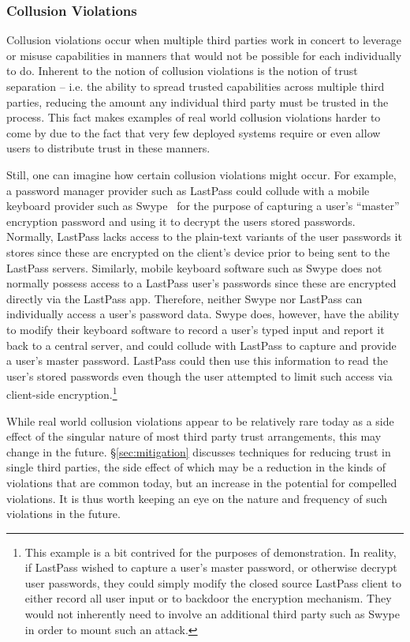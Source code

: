 \subsubsection{Collusion Violations}

Collusion violations occur when multiple third parties work in concert
to leverage or misuse capabilities in manners that would not be
possible for each individually to do. Inherent to the notion of
collusion violations is the notion of trust separation -- i.e. the
ability to spread trusted capabilities across multiple third parties,
reducing the amount any individual third party must be trusted in the
process. This fact makes examples of real world collusion violations
harder to come by due to the fact that very few deployed systems
require or even allow users to distribute trust in these manners.

Still, one can imagine how certain collusion violations might
occur. For example, a password manager provider such as LastPass could
collude with a mobile keyboard provider such as Swype~\cite{swype} for
the purpose of capturing a user's ``master'' encryption password and
using it to decrypt the users stored passwords. Normally, LastPass
lacks access to the plain-text variants of the user passwords it
stores since these are encrypted on the client's device prior to being
sent to the LastPass servers. Similarly, mobile keyboard software such
as Swype does not normally possess access to a LastPass user's
passwords since these are encrypted directly via the LastPass
app. Therefore, neither Swype nor LastPass can individually access a
user's password data. Swype does, however, have the ability to modify
their keyboard software to record a user's typed input and report it
back to a central server, and could collude with LastPass to capture
and provide a user's master password. LastPass could then use this
information to read the user's stored passwords even though the user
attempted to limit such access via client-side
encryption.\footnote{This example is a bit contrived for the purposes
  of demonstration. In reality, if LastPass wished to capture a user's
  master password, or otherwise decrypt user passwords, they could
  simply modify the closed source LastPass client to either record all
  user input or to backdoor the encryption mechanism. They would not
  inherently need to involve an additional third party such as Swype
  in order to mount such an attack.}

While real world collusion violations appear to be relatively rare
today as a side effect of the singular nature of most third party
trust arrangements, this may change in the
future. \S\ref{sec:mitigation} discusses techniques for reducing
trust in single third parties, the side effect of which may be a
reduction in the kinds of violations that are common today, but an
increase in the potential for compelled violations. It is thus worth
keeping an eye on the nature and frequency of such violations in the
future.

